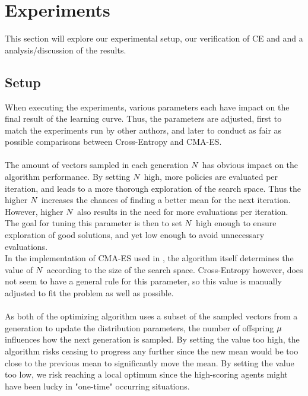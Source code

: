 \section{Experiments}

This section will explore our experimental setup, our verification of CE and 
and a analysis/discussion of the results.

\subsection{Setup}

When executing the experiments, various parameters each have 
impact on the final result of the learning curve. Thus, the parameters
are adjusted, first to match the experiments run by other authors, and later
to conduct as fair as possible comparisons between Cross-Entropy and 
CMA-ES.\\
\\
The amount of vectors sampled in each generation $N$
has obvious impact on the algorithm performance. By setting $N$
high, more policies are evaluated per iteration, and leads to a more thorough 
exploration of the search space. Thus the higher $N$ increases the
chances of finding a better mean for the next iteration.
However, higher $N$ also results in the
need for more evaluations per iteration. The goal for tuning this parameter is then
to set $N$ high enough to ensure exploration of good solutions, and yet 
low enough to avoid unnecessary evaluations.\\
In the implementation of CMA-ES used in \shark , the algorithm  itself determines
the value of $N$ according to the size of the search space. 
Cross-Entropy however, does not seem to have a general rule for this parameter,
so this value is manually adjusted to fit the problem as well as possible.\\
\\
As both of the optimizing algorithm uses a subset of the sampled vectors
from a generation to update the distribution parameters, the number of 
offspring $\mu$ influences how the next generation is sampled.
By setting the value too high, the algorithm risks ceasing to progress any 
further since the new mean would be too close to the previous mean to 
significantly move the mean. By setting the value too low,
we risk reaching a local optimum since the high-scoring agents 
might have been lucky in "one-time" occurring situations.\\
